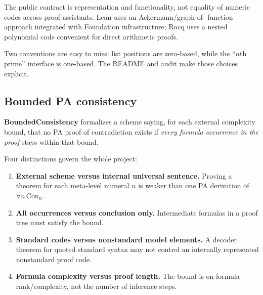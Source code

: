 \documentclass[
  10pt,
  a4paper,
  twoside,
  open=any,
  parskip=half,
  headings=big
]{scrreprt}
\newcommand{\project}[1]{\textsf{\bfseries #1}}
\begin{document}
The public contract is representation and functionality, not equality of
numeric codes across proof assistants.  Lean uses an Ackermann/graph-of-
function approach integrated with Foundation infrastructure; Rocq uses a
nested polynomial code convenient for direct arithmetic proofs.

Two conventions are easy to miss: list positions are zero-based, while the
``\(n\)th prime'' interface is one-based.  The README and audit make those
choices explicit.

\subsection{Bounded PA consistency}

\project{BoundedConsistency} formalizes a scheme saying, for each external
complexity bound, that no PA proof of contradiction exists if
\emph{every formula occurrence in the proof} stays within that bound.

Four distinctions govern the whole project:

\begin{enumerate}
  \item \textbf{External scheme versus internal universal sentence.}
        Proving a theorem for each meta-level numeral \(n\) is weaker than one
        PA derivation of \(\forall n\,\mathrm{Con}_n\).
  \item \textbf{All occurrences versus conclusion only.}
        Intermediate formulas in a proof tree must satisfy the bound.
  \item \textbf{Standard codes versus nonstandard model elements.}
        A decoder theorem for quoted standard syntax may not control an
        internally represented nonstandard proof code.
  \item \textbf{Formula complexity versus proof length.}
        The bound is on formula rank/complexity, not the number of inference
        steps.
\end{enumerate}
\end{document}
